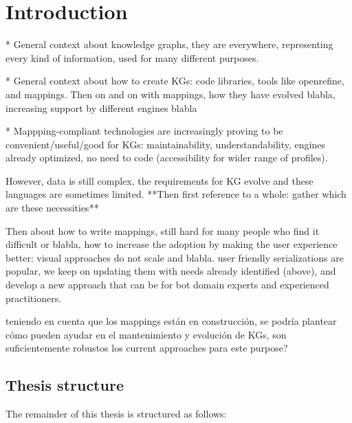 \chapter{Introduction}
\label{chapter:intro}


* General context about knowledge graphs, they are everywhere, representing every kind of information, used for many different purposes. 

* General context about how to create KGs: code libraries, tools like openrefine, and mappings. Then on and on with mappings, how they have evolved blabla, increasing support by different engines blabla

* Mappping-compliant technologies are increasingly proving to be convenient/useful/good for KGs: maintainability, understandability, engines already optimized, no need to code (accessibility for wider range of profiles). 

However, data is still complex, the requirements for KG evolve and these languages are sometimes limited. **Then first reference to a whole: gather which are these necessities**

Then about how to write mappings, still hard for many people who find it difficult or blabla, how to increase the adoption by making the user experience better: visual approaches do not scale and blabla. user friendly serializations are popular, we keep on updating them with needs already identified (above), and develop a new approach that can be for bot domain experts and experienced practitioners.

 teniendo en cuenta que los mappings están en construcción, se podría plantear cómo pueden ayudar en el mantenimiento y evolución de KGs, son suficientemente robustos los current approaches para este purpose?

\section{Thesis structure}

The remainder of this thesis is structured as follows:

